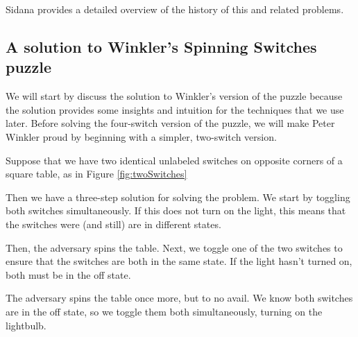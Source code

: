 Sidana \cite{Sidana2020} provides a detailed overview of the history of this
and related problems.

\subsection{A solution to Winkler's Spinning Switches puzzle}

We will start by discuss the solution to Winkler's version of the puzzle because
the solution provides some insights and intuition for the techniques that we use
later. Before solving the four-switch version of the puzzle,
we will make Peter Winkler proud by beginning with a simpler, two-switch version.

\begin{example}
  Suppose that we have two identical unlabeled switches on opposite corners
  of a square table, as in Figure \ref{fig:twoSwitches}

  Then we have a three-step solution for solving the problem. We start by
  toggling both switches simultaneously. If this does not turn on the light,
  this means that the switches were (and still) are in different states.

  Then, the adversary spins the table. Next, we toggle one of the two switches
  to ensure that the switches are both in the same state. If the light hasn't
  turned on, both must be in the off state.

  The adversary spins the table once more, but to no avail. We know both
  switches are in the off state, so we toggle them both simultaneously, turning
  on the lightbulb.
\end{example}

